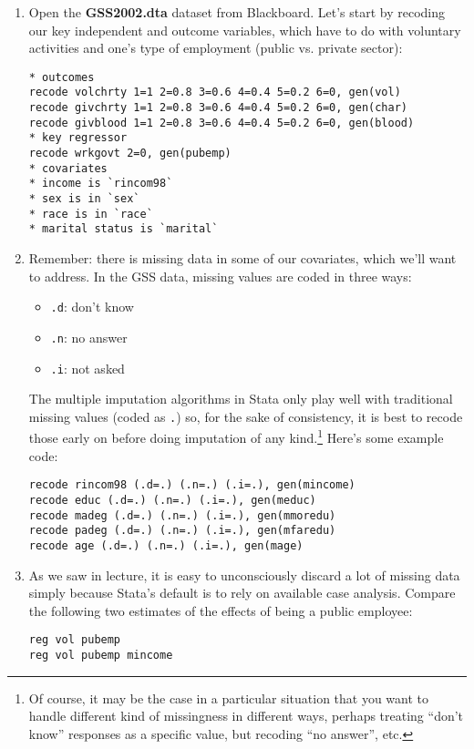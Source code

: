 \documentclass[a4paper,12pt]{article}
\begin{document}
\begin{enumerate}
\item Open the \textbf{GSS2002.dta} dataset from Blackboard. Let's start by recoding our key independent and outcome variables, which have to do with voluntary activities and one's type of employment (public vs. private sector):
\begin{verbatim}
* outcomes
recode volchrty 1=1 2=0.8 3=0.6 4=0.4 5=0.2 6=0, gen(vol)
recode givchrty 1=1 2=0.8 3=0.6 4=0.4 5=0.2 6=0, gen(char)
recode givblood 1=1 2=0.8 3=0.6 4=0.4 5=0.2 6=0, gen(blood)
* key regressor
recode wrkgovt 2=0, gen(pubemp)
* covariates
* income is `rincom98`
* sex is in `sex`
* race is in `race`
* marital status is `marital`
\end{verbatim}

\item Remember: there is missing data in some of our covariates, which we'll want to address. In the GSS data, missing values are coded in three ways:

	\begin{itemize}
	\item \texttt{.d}: don't know
	\item \texttt{.n}: no answer
	\item \texttt{.i}: not asked
	\end{itemize}

The multiple imputation algorithms in Stata only play well with traditional missing values (coded as \texttt{.}) so, for the sake of consistency, it is best to recode those early on before doing imputation of any kind.\footnote{Of course, it may be the case in a particular situation that you want to handle different kind of missingness in different ways, perhaps treating ``don't know'' responses as a specific value, but recoding ``no answer'', etc.} Here's some example code:
\begin{verbatim}
recode rincom98 (.d=.) (.n=.) (.i=.), gen(mincome)
recode educ (.d=.) (.n=.) (.i=.), gen(meduc)
recode madeg (.d=.) (.n=.) (.i=.), gen(mmoredu)
recode padeg (.d=.) (.n=.) (.i=.), gen(mfaredu)
recode age (.d=.) (.n=.) (.i=.), gen(mage)
\end{verbatim}


\item As we saw in lecture, it is easy to unconsciously discard a lot of missing data simply because Stata's default is to rely on available case analysis. Compare the following two estimates of the effects of being a public employee:

\begin{verbatim}
reg vol pubemp
reg vol pubemp mincome
\end{verbatim}


\end{enumerate}
\end{document}
